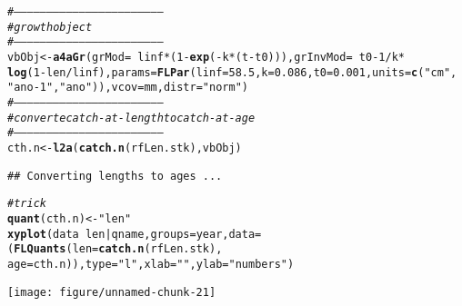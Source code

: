 \documentclass[a4paper,english,10pt]{article}\usepackage[]{graphicx}\usepackage[]{color}
\makeatletter
\def\maxwidth{ %
  \ifdim\Gin@nat@width>\linewidth
    \linewidth
  \else
    \Gin@nat@width
  \fi
}
\newcommand{\hlnum}[1]{\textcolor[rgb]{0.686,0.059,0.569}{#1}}%
\newcommand{\hlstr}[1]{\textcolor[rgb]{0.192,0.494,0.8}{#1}}%
\newcommand{\hlcom}[1]{\textcolor[rgb]{0.678,0.584,0.686}{\textit{#1}}}%
\newcommand{\hlopt}[1]{\textcolor[rgb]{0,0,0}{#1}}%
\newcommand{\hlstd}[1]{\textcolor[rgb]{0.345,0.345,0.345}{#1}}%
\newcommand{\hlkwb}[1]{\textcolor[rgb]{0.69,0.353,0.396}{#1}}%
\newcommand{\hlkwc}[1]{\textcolor[rgb]{0.333,0.667,0.333}{#1}}%
\newcommand{\hlkwd}[1]{\textcolor[rgb]{0.737,0.353,0.396}{\textbf{#1}}}%
\newenvironment{kframe}{%
 \def\at@end@of@kframe{}%
 \ifinner\ifhmode%
  \def\at@end@of@kframe{\end{minipage}}%
  \begin{minipage}{\columnwidth}%
 \fi\fi%
 \def\FrameCommand##1{\hskip\@totalleftmargin \hskip-\fboxsep
 \colorbox{shadecolor}{##1}\hskip-\fboxsep
     \hskip-\linewidth \hskip-\@totalleftmargin \hskip\columnwidth}%
 \MakeFramed {\advance\hsize-\width
   \@totalleftmargin\z@ \linewidth\hsize
   \@setminipage}}%
 {\par\unskip\endMakeFramed%
 \at@end@of@kframe}
\newenvironment{knitrout}{}{} %
\makeatother
\begin{document}
\begin{knitrout}
\color{fgcolor}\begin{kframe}
\begin{alltt}
\hlcom{# --------------------------------------------------------------------}
\hlcom{# growth object}
\hlcom{# --------------------------------------------------------------------}
\hlstd{vbObj} \hlkwb{<-} \hlkwd{a4aGr}\hlstd{(}\hlkwc{grMod} \hlstd{=} \hlopt{~}\hlstd{linf} \hlopt{*} \hlstd{(}\hlnum{1} \hlopt{-} \hlkwd{exp}\hlstd{(}\hlopt{-}\hlstd{k} \hlopt{*} \hlstd{(t} \hlopt{-} \hlstd{t0))),} \hlkwc{grInvMod} \hlstd{=} \hlopt{~}\hlstd{t0} \hlopt{-} \hlnum{1}\hlopt{/}\hlstd{k} \hlopt{*}
    \hlkwd{log}\hlstd{(}\hlnum{1} \hlopt{-} \hlstd{len}\hlopt{/}\hlstd{linf),} \hlkwc{params} \hlstd{=} \hlkwd{FLPar}\hlstd{(}\hlkwc{linf} \hlstd{=} \hlnum{58.5}\hlstd{,} \hlkwc{k} \hlstd{=} \hlnum{0.086}\hlstd{,} \hlkwc{t0} \hlstd{=} \hlnum{0.001}\hlstd{,} \hlkwc{units} \hlstd{=} \hlkwd{c}\hlstd{(}\hlstr{"cm"}\hlstd{,}
    \hlstr{"ano-1"}\hlstd{,} \hlstr{"ano"}\hlstd{)),} \hlkwc{vcov} \hlstd{= mm,} \hlkwc{distr} \hlstd{=} \hlstr{"norm"}\hlstd{)}
\hlcom{# --------------------------------------------------------------------}
\hlcom{# converte catch-at-length to catch-at-age}
\hlcom{# --------------------------------------------------------------------}
\hlstd{cth.n} \hlkwb{<-} \hlkwd{l2a}\hlstd{(}\hlkwd{catch.n}\hlstd{(rfLen.stk), vbObj)}
\end{alltt}
\begin{verbatim}
## Converting lengths to ages ...
\end{verbatim}


{\ttfamily\noindent\color{warningcolor}{\#\# Warning: NaNs produced}}\end{kframe}
\end{knitrout}


\begin{knitrout}
\color{fgcolor}\begin{kframe}
\begin{alltt}
\hlcom{# trick}
\hlkwd{quant}\hlstd{(cth.n)} \hlkwb{<-} \hlstr{"len"}
\hlkwd{xyplot}\hlstd{(data} \hlopt{~} \hlstd{len} \hlopt{|} \hlstd{qname,} \hlkwc{groups} \hlstd{= year,} \hlkwc{data} \hlstd{= (}\hlkwd{FLQuants}\hlstd{(}\hlkwc{len} \hlstd{=} \hlkwd{catch.n}\hlstd{(rfLen.stk),}
    \hlkwc{age} \hlstd{= cth.n)),} \hlkwc{type} \hlstd{=} \hlstr{"l"}\hlstd{,} \hlkwc{xlab} \hlstd{=} \hlstr{""}\hlstd{,} \hlkwc{ylab} \hlstd{=} \hlstr{"numbers"}\hlstd{)}
\end{alltt}
\end{kframe}
\texttt{[image: figure/unnamed-chunk-21]} 

\end{knitrout}
\end{document}
